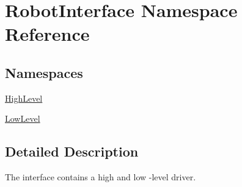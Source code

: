 \hypertarget{namespaceRobotInterface}{}\section{Robot\+Interface Namespace Reference}
\label{namespaceRobotInterface}
\subsection*{Namespaces}
\begin{DoxyCompactItemize}
\item 
 \hyperlink{namespaceRobotInterface_1_1HighLevel}{High\+Level}
\item 
 \hyperlink{namespaceRobotInterface_1_1LowLevel}{Low\+Level}
\end{DoxyCompactItemize}


\subsection{Detailed Description}
The interface contains a high and low -\/level driver. 